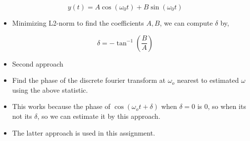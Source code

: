 \documentclass[10pt,a4paper]{article}
\providecommand{\tightlist}{%
      \setlength{\itemsep}{0pt}\setlength{\parskip}{0pt}}
\begin{document}
\begin{equation}
y(t) = A\cos(\omega_0 t) + B\sin(\omega_0 t)
\end{equation}

\begin{itemize}
\tightlist
\item
  Minimizing L2-norm to find the coefficients \(A, B\), we can compute
  \(\delta\) by,
\end{itemize}

\begin{equation}
\delta = -\tan^{-1}(\frac{B}{A})
\end{equation}

\begin{itemize}
\tightlist
\item
  Second approach
\item
  Find the phase of the discrete fourier transform at \(\omega_o\)
  nearest to estimated \(\omega\) using the above statistic.
\item
  This works because the phase of \(\cos(\omega_o t+\delta)\) when
  \(\delta = 0\) is 0, so when its not its \(\delta\), so we can
  estimate it by this approach.
\item
  The latter approach is used in this assignment.
\end{itemize}

	

	
		
	
	
		
	
		
			
		
	
		
			
		
	
		
			
		
	
		
			
		
	
		
			
		
	
		
			
		
	
		
			
		
	
		
			
		
	
		
			
		
	
		
			
		
	
		
			
		
	
		
			
\end{document}
